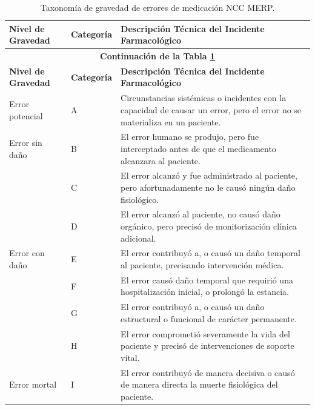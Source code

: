 \begin{longtable}{m{} m{} m{}}
 \caption{Taxonomía de gravedad de errores de medicación NCC MERP.}
  \label{table:taxonomiaNCCMERP}\\
\hline
\textbf{Nivel de Gravedad}&
\textbf{Categoría} &
\textbf{Descripción Técnica del Incidente Farmacológico} \\
\hline
\endfirsthead

\multicolumn{3}{c}{\textbf{Continuación de la Tabla \ref{table:taxonomiaNCCMERP}}}\\
\hline
\textbf{Nivel de Gravedad}&
\textbf{Categoría} &
\textbf{Descripción Técnica del Incidente Farmacológico} \\
\hline
\endhead
\hline
\endlastfoot

Error potencial & 
A & 
Circunstancias sistémicas o incidentes con la capacidad de causar un error, pero el error no se materializa en un paciente. \\
\midrule
Error sin daño & 
B & 
El error humano se produjo, pero fue interceptado antes de que el medicamento alcanzara al paciente. \\
 & 
C & 
El error alcanzó y fue administrado al paciente, pero afortunadamente no le causó ningún daño fisiológico. \\
 & 
D & 
El error alcanzó al paciente, no causó daño orgánico, pero precisó de monitorización clínica adicional. \\
\midrule
Error con daño & 
E & 
El error contribuyó a, o causó un daño temporal al paciente, precisando intervención médica. \\
 & 
F & 
El error causó daño temporal que requirió una hospitalización inicial, o prolongó la estancia. \\
 & 
G & 
El error contribuyó a, o causó un daño estructural o funcional de carácter permanente. \\
 & 
H & 
El error comprometió severamente la vida del paciente y precisó de intervenciones de soporte vital. \\
\midrule
Error mortal & 
I & 
El error contribuyó de manera decisiva o causó de manera directa la muerte fisiológica del paciente. \\
\bottomrule
\end{longtable}

